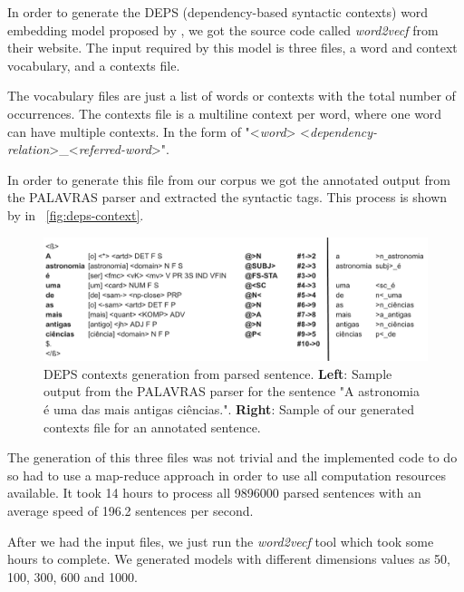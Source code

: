 In order to generate the DEPS (dependency-based syntactic contexts) word embedding model proposed by , we got the source code called \textit{word2vecf} from their website. The input required by this model is three files, a word and context vocabulary, and a contexts file. 

The vocabulary files are just a list of words or contexts with the total number of occurrences. The contexts file is a multiline context per word, where one word can have multiple contexts. In the form of "<\textit{word}> <\textit{dependency-relation}>\_<\textit{referred-word}>".

In order to generate this file from our corpus we got the annotated output from the PALAVRAS parser and extracted the syntactic tags. This process is shown by in ~\autoref{fig:deps-context}.

\begin{figure}[h]
	\caption{DEPS contexts generation from parsed sentence. \textbf{Left}: Sample output from the PALAVRAS parser for the sentence "A astronomia é uma das mais antigas ciências.". \textbf{Right}: Sample of our generated contexts file for an annotated sentence.}
	\label{fig:deps-context}
	\centering%
	\begin{minipage}{.95\textwidth}
		\includegraphics[width=\textwidth]{deps-context.png}
	\end{minipage}
\end{figure}

The generation of this three files was not trivial and the implemented code to do so had to use a map-reduce approach in order to use all computation resources available. It took 14 hours to process all 9896000 parsed sentences with an average speed of 196.2 sentences per second.

After we had the input files, we just run the \textit{word2vecf} tool which took some hours to complete. We generated models with different dimensions values as 50, 100, 300, 600 and 1000.